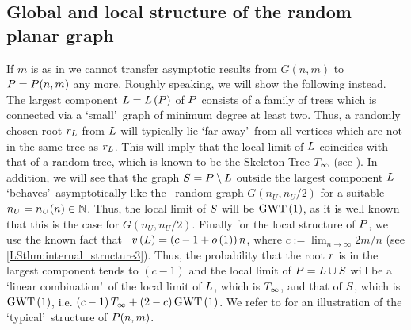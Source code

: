\subsection{Global and local structure of the random planar graph}
If $m$ is as in  we cannot transfer asymptotic results from $G(n,m)$ to $P=P(n,m)$ any more. Roughly speaking, we will show the following instead. The largest component $L=L\left(P\right)$ of $P$ consists of a family of trees which is connected via a \lq small\rq\ graph of minimum degree at least two. Thus, a randomly chosen root $r_L$ from $L$ will typically lie \lq far away\rq\ from all vertices which are not in the same tree as $r_L$. This will imply that the local limit of $L$ coincides with that of a random tree, which is known to be the Skeleton Tree $T_\infty$ (see ). In addition, we will see that the graph $S=P\setminus L$ outside the largest component $L$ \lq behaves\rq\ asymptotically like the \ER\ random graph $G(n_U, n_U/2)$ for a suitable $n_U=n_U(n)\in\mathbb{N}$. Thus, the local limit of $S$ will be $\operatorname{GWT}\left(1\right)$, as it is well known that this is the case for $G(n_U, n_U/2)$. Finally for the local structure of $P$, we use the known fact that \whp\ $v\left({L}\right)=\left(c-1+o\left(1\right)\right)n$, where $c:=\lim_{n\to\infty} 2m/n$ (see \ref{LSthm:internal_structure3}). Thus, the probability that the root $r$ is in the largest component tends to $(c-1)$ and the local limit of $P=L \cup S$ will be a \lq linear combination\rq\ of the local limit of $L$, which is $T_\infty$, and that of $S$, which is $\operatorname{GWT}\left(1\right)$, i.e. $\left(c-1\right)T_\infty+\left(2-c\right)\operatorname{GWT}\left(1\right)$. We refer to  for an illustration of the \lq typical\rq\ structure of $P(n,m)$.

